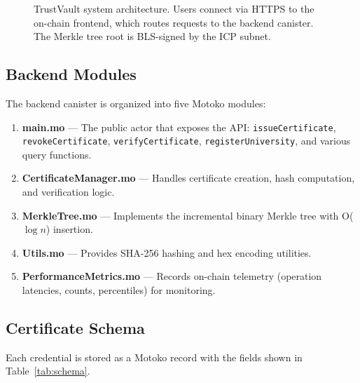 \documentclass[journal]{IEEEtran}
\begin{document}
\begin{figure}[t]
\caption{TrustVault system architecture. Users connect via HTTPS to the on-chain frontend, which routes requests to the backend canister. The Merkle tree root is BLS-signed by the ICP subnet.}
\label{fig:sysarch}
\end{figure}

\subsection{Backend Modules}

The backend canister is organized into five Motoko modules:

\begin{enumerate}
  \item \textbf{main.mo} — The public actor that exposes the API: \texttt{issueCertificate}, \texttt{revokeCertificate}, \texttt{verifyCertificate}, \texttt{registerUniversity}, and various query functions.
  \item \textbf{CertificateManager.mo} — Handles certificate creation, hash computation, and verification logic.
  \item \textbf{MerkleTree.mo} — Implements the incremental binary Merkle tree with O($\log n$) insertion.
  \item \textbf{Utils.mo} — Provides SHA-256 hashing and hex encoding utilities.
  \item \textbf{PerformanceMetrics.mo} — Records on-chain telemetry (operation latencies, counts, percentiles) for monitoring.
\end{enumerate}

\subsection{Certificate Schema}

Each credential is stored as a Motoko record with the fields shown in Table~\ref{tab:schema}.
\end{document}
